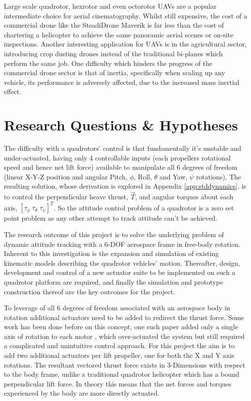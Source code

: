 \par
Large scale quadrotor, hexrotor and even octorotor UAVs are a popular intermediate choice for aerial cinematography.  Whilst still expensive, the cost of a commercial drone like the SteadiDrone Maverik \cite{steadidrone} is far less than the cost of chartering a helicopter to achieve the same panoramic aerial scenes or on-site inspections. Another interesting application for UAVs is in the agricultural sector, introducing crop dusting drones instead of the traditional bi-planes which perform the same job. One difficulty which hinders the progress of the commercial drone sector is that of inertia, specifically when scaling up any vehicle, its performance is adversely affected, due to the increased mass inertial effect.
\section{Research Questions \& Hypotheses}
\label{sec:ch1.hypotheses}
The difficulty with a quadrotors' control is that fundamentally it's unstable and under-actuated, having only 4 controllable inputs (each propellers rotational speed and hence net lift force) available to manipulate all 6 degrees of freedom (linear X-Y-Z position and angular Pitch, $\phi$, Roll, $\theta$ and Yaw, $\psi$ rotations). The resulting solution, whose derivation is explored in Appendix \ref{app:stddynamics}, is to control the perpendicular heave thrust, $\vec{T}$, and angular torques about each axis, $[\tau_\phi\;\tau_\theta\;\tau_\psi]^T$. So the attitude control problem of a quadrotor is a zero set point problem as any other attempt to track attitude can't be achieved.
\par
The research outcome of this project is to solve the underlying problem of dynamic attitude tracking with a 6-DOF aerospace frame in free-body rotation. Inherent to this investigation is the expansion and simulation of existing kinematic models describing the quadrotor vehicles' motion. Thereafter, design, development and control of a new actuator suite to be implemented on such a quadrotor platform are required, and finally the simulation and prototype construction thereof are the key outcomes for the project.
\par
To leverage of all 6 degrees of freedom associated with an aerospace body in rotation additional actuators need to be added to redirect the thrust force. Some work has been done before on this concept, one such paper added only a single axis of rotation to each motor \cite{tiltpropellerflight} , which over-actuated the system but still required a complicated and unintuitive control approach. For this project the aim is to add two additional actuators per lift propeller, one for both the X and Y axis rotations. The resultant vectored thrust force exists in 3-Dimensions with respect to the body frame, unlike a traditional quadrotor helicopter which has a bound perpendicular lift force. In theory this means that the net forces and torques experienced by the body are more directly actuated.
